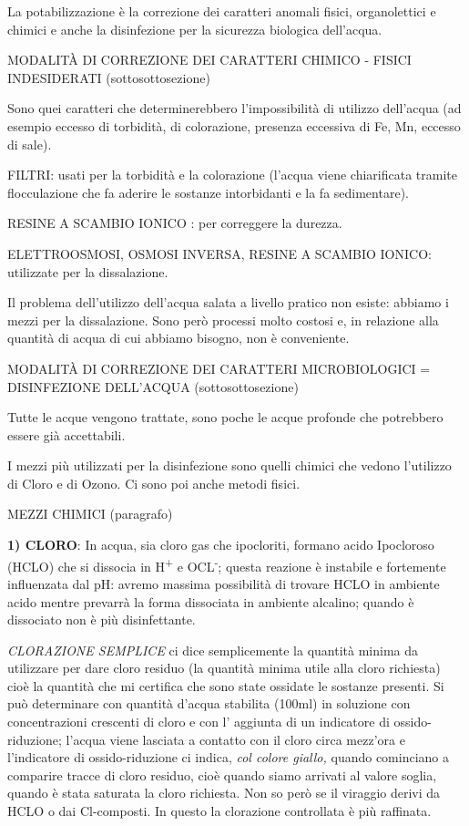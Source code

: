 \documentclass[]{article}
\begin{document}
La potabilizzazione è la correzione dei caratteri anomali fisici,
organolettici e chimici e anche la disinfezione per la sicurezza
biologica dell'acqua.

MODALITÀ DI CORREZIONE DEI CARATTERI CHIMICO - FISICI INDESIDERATI
(sottosottosezione)

Sono quei caratteri che determinerebbero l'impossibilità di utilizzo
dell'acqua (ad esempio eccesso di torbidità, di colorazione, presenza
eccessiva di Fe, Mn, eccesso di sale).

FILTRI: usati per la torbidità e la colorazione (l'acqua viene
chiarificata tramite flocculazione che fa aderire le sostanze
intorbidanti e la fa sedimentare).

RESINE A SCAMBIO IONICO : per correggere la durezza.

ELETTROOSMOSI, OSMOSI INVERSA, RESINE A SCAMBIO IONICO: utilizzate per
la dissalazione.

Il problema dell'utilizzo dell'acqua salata a livello pratico non
esiste: abbiamo i mezzi per la dissalazione. Sono però processi molto
costosi e, in relazione alla quantità di acqua di cui abbiamo bisogno,
non è conveniente.

MODALITÀ DI CORREZIONE DEI CARATTERI MICROBIOLOGICI = DISINFEZIONE
DELL'ACQUA (sottosottosezione)

Tutte le acque vengono trattate, sono poche le acque profonde che
potrebbero essere già accettabili.

I mezzi più utilizzati per la disinfezione sono quelli chimici che
vedono l'utilizzo di Cloro e di Ozono. Ci sono poi anche metodi fisici.

MEZZI CHIMICI (paragrafo)

\textbf{1) CLORO}: In acqua, sia cloro gas che ipocloriti, formano acido
Ipocloroso (HCLO) che si dissocia in H\textsuperscript{+} e
OCL\textsuperscript{-}; questa reazione è instabile e fortemente
influenzata dal pH: avremo massima possibilità di trovare HCLO in
ambiente acido mentre prevarrà la forma dissociata in ambiente alcalino;
quando è dissociato non è più disinfettante.

\emph{CLORAZIONE SEMPLICE} ci dice semplicemente la quantità minima da
utilizzare per dare cloro residuo (la quantità minima utile alla cloro
richiesta) cioè la quantità che mi certifica che sono state ossidate le
sostanze presenti. Si può determinare con quantità d'acqua stabilita
(100ml) in soluzione con concentrazioni crescenti di cloro e con l'
aggiunta di un indicatore di ossido-riduzione; l'acqua viene lasciata a
contatto con il cloro circa mezz'ora e l'indicatore di ossido-riduzione
ci indica, \emph{col colore giallo,} quando cominciano a comparire
tracce di cloro residuo, cioè quando siamo arrivati al valore soglia,
quando è stata saturata la cloro richiesta. Non so però se il viraggio
derivi da HCLO o dai Cl-composti. In questo la clorazione controllata è
più raffinata.
\end{document}
